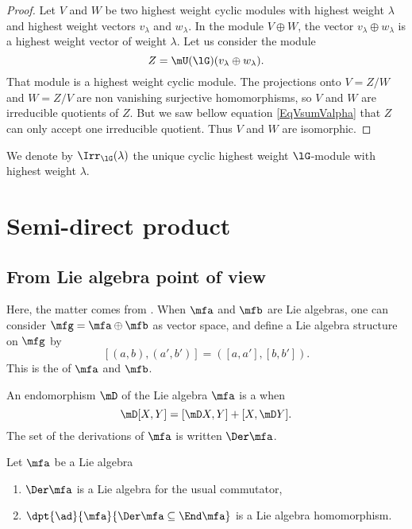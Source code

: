\begin{proof}
Let $V$ and $W$ be two highest weight cyclic modules with highest weight $\lambda$ and highest weight vectors $v_{\lambda}$ and $w_{\lambda}$. In the module $V\oplus W$, the vector $v_{\lambda}\oplus w_{\lambda}$ is a highest weight vector of weight $\lambda$. Let us consider the module
\begin{equation}
    Z=\mU(\lG)(v_{\lambda}\oplus w_{\lambda}).
\end{equation}
That module is a highest weight cyclic module. The projections onto $V=Z/W$ and $W=Z/V$ are non vanishing surjective homomorphisms, so $V$ and $W$ are irreducible quotients of $Z$. But we saw bellow equation \eqref{EqVsumValpha} that $Z$ can only accept one irreducible quotient. Thus $V$ and $W$ are isomorphic.
\end{proof}
We denote by $\Irr_{\lG}(\lambda)$ the unique cyclic highest weight $\lG$-module with highest weight $\lambda$.




\section{Semi-direct product}

\subsection{From Lie algebra point of view}\label{subsec:semi_Lie}

Here, the matter comes from \cite{Knapp,newfromold}. When $\mfa$ and $\mfb$ are Lie algebras, one can consider $\mfg=\mfa\oplus\mfb$ as vector space, and define a Lie algebra structure on $\mfg$ by
\[
     [ (a,b),(a',b') ]=( [a,a'],[b,b'] ).
\]
This is the  of $\mfa$ and $\mfb$.

An endomorphism $\mD$ of the Lie algebra $\mfa$ is a  when
\[
   \mD[X,Y]=[\mD X,Y]+[X,\mD Y].
\]
The set of the derivations of $\mfa$ is written $\Der\mfa$.

\begin{proposition}\label{prop:Lie_derr}
    Let $\mfa$ be a Lie algebra
    \begin{enumerate}
        \item $\Der\mfa$ is a Lie algebra for the usual commutator,
        \item $\dpt{\ad}{\mfa}{\Der\mfa\subseteq\End\mfa}$ is a Lie algebra homomorphism.
    \end{enumerate}
\end{proposition}

